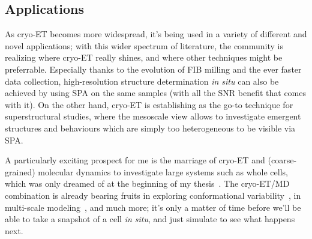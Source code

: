 \subsection{Applications}

As cryo-ET becomes more widespread, it's being used in a variety of different and novel applications; with this wider spectrum of literature, the community is realizing where cryo-ET really shines, and where other techniques might be preferrable.
Especially thanks to the evolution of FIB milling and the ever faster data collection, high-resolution structure determination \textit{in situ} can also be achieved by using SPA on the same samples (with all the SNR benefit that comes with it).
On the other hand, cryo-ET is establishing as the go-to technique for superstructural studies, where the mesoscale view allows to investigate emergent structures and behaviours which are simply too heterogeneous to be visible via SPA.

A particularly exciting prospect for me is the marriage of cryo-ET and (coarse-grained) molecular dynamics to investigate large systems such as whole cells, which was only dreamed of at the beginning of my thesis~\cite{earnestChallengesIntegratingStochastic2017}.
The cryo-ET/MD combination is already bearing fruits in exploring conformational variability~\cite{vuillemotMDTOMOMethodContinuous2023}, in multi-scale modeling~\cite{liDevelopmentMultiscaleUltracoarsegrained2023}, and much more; it's only a matter of time before we'll be able to take a snapshot of a cell \textit{in situ}, and just simulate to see what happens next.

